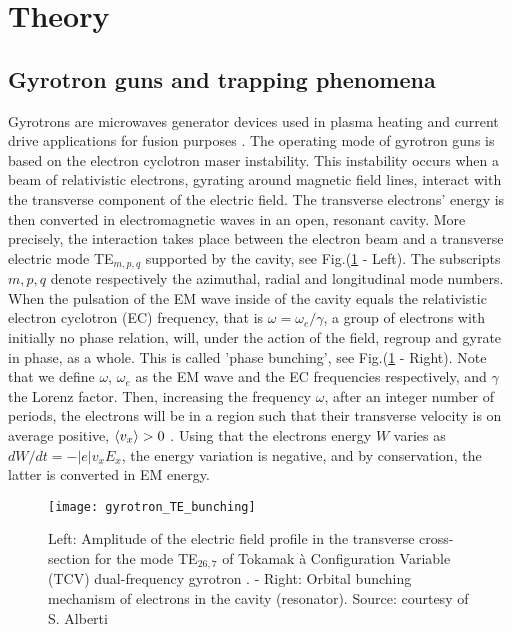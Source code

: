 \section{Theory}\label{Theory}

\subsection{Gyrotron guns and trapping phenomena}


Gyrotrons are microwaves generator devices used in plasma heating and current drive applications for fusion purposes \cite{Pagonakis}. The operating mode of gyrotron guns is based on the electron cyclotron maser instability. This instability occurs when a beam of relativistic electrons, gyrating around magnetic field lines, interact with the transverse component of the electric field. The transverse electrons' energy is then converted in electromagnetic waves in an open, resonant cavity. More precisely, the interaction takes place between the electron beam and a transverse electric mode TE$_{m,p,q}$ supported by the cavity, see Fig.(\ref{modes} - Left). The subscripts $m,p,q$ denote respectively the azimuthal, radial and longitudinal mode numbers. When the pulsation of the EM wave inside of the cavity equals the relativistic electron cyclotron (EC) frequency, that is $\omega = \omega_e/\gamma$, a group of electrons with initially no phase relation, will, under the action of the field, regroup and gyrate in phase, as a whole. This is called 'phase bunching', see Fig.(\ref{modes} - Right). Note that we define $\omega$, $\omega_e$ as the EM wave and the EC frequencies respectively, and $\gamma$ the Lorenz factor.  Then, increasing the frequency $\omega$, after an integer number of periods, the electrons will be in a region such that their transverse velocity is on average positive, $\braket{v_x} > 0$ \cite{AlbertiThesis}. Using that the electrons energy $W$ varies as $dW/dt = -|e|v_xE_x$, the energy variation is negative, and by conservation, the latter is converted in EM energy.\\

\begin{figure}[h!]
\centering
	\texttt{[image: gyrotron\_TE\_bunching]}
	\caption{\label{modes}Left: Amplitude of the electric field profile in the transverse cross-section for the mode TE$_{26,7}$ of Tokamak à Configuration Variable (TCV) dual-frequency gyrotron \cite{GenoudThesis}. - Right:  Orbital bunching mechanism of electrons in the cavity (resonator). Source: courtesy of S. Alberti}
\end{figure}  

